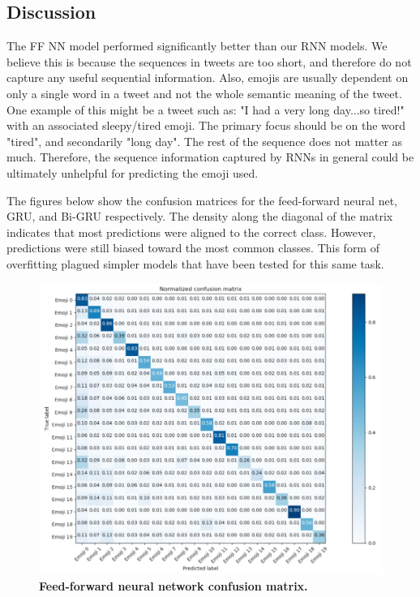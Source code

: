 \documentclass[11pt,a4paper]{article}
\begin{document}
\subsection{Discussion}
	The FF NN model performed significantly better than our RNN models. We believe this is because the sequences in tweets are too short, and therefore do not capture any useful sequential information. Also, emojis are usually dependent on only a single word in a tweet and not the whole semantic meaning of the tweet. One example of this might be a tweet such as: "I had a very long day...so tired!" with an associated sleepy/tired emoji. The primary focus should be on the word "tired", and secondarily "long day".  The rest of the sequence does not matter as much. Therefore, the sequence information captured by RNNs in general could be ultimately unhelpful for predicting the emoji used.
	\par
	The figures below show the confusion matrices for the feed-forward neural net, GRU, and Bi-GRU respectively. The density along the diagonal of the matrix indicates that most predictions were aligned to the correct class. However, predictions were still biased toward the most common classes. This form of overfitting plagued simpler models that have been tested for this same task.
	\begin{figure}[H]
		\centering\includegraphics[scale=0.27]{ffnn_confusion} 
		\caption{\textbf{Feed-forward neural network confusion matrix.}}
	\end{figure}
\end{document}
